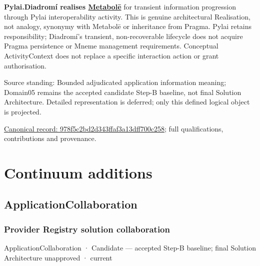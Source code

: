 \textbf{Pylai.Diadromí realises
\hyperref[element:c34b4929f71946708d37dbe6c1da920a]{Metabolē}}
for transient information progression through Pylai interoperability activity.
This is genuine architectural Realisation, not analogy, synonymy with Metabolē
or inheritance from Pragma. Pylai retains responsibility; Diadromí's transient,
non-recoverable lifecycle does not acquire Pragma persistence or Mneme management
requirements. Conceptual ActivityContext does not replace a specific interaction
action or grant authorisation.



Source standing: Bounded adjudicated application information meaning; Domain05 remains the accepted candidate Step-B baseline, not final Solution Architecture. Detailed representation is deferred; only this defined logical object is projected.


{\footnotesize \href{../../../../continuum/application/data-object/978f5c2bd2d343ffaf3a13dff700c258.md}{Canonical record: 978f5c2bd2d343ffaf3a13dff700c258}; full qualifications, contributions and provenance.}\par
\chapter{Continuum additions}

\section{ApplicationCollaboration}

\subsection{Provider Registry solution collaboration}

\label{element:9305dc8d55b34b70950190e28b5464cf}
{\small ApplicationCollaboration · Candidate — accepted Step-B baseline; final Solution Architecture unapproved · current}\par


